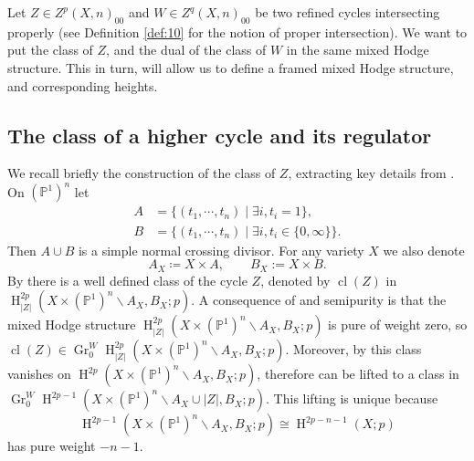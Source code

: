 \documentclass[11pt,a4paper]{amsart}
\renewcommand{\P}{\mathds{P}}
\DeclareMathOperator {\Gr} {Gr}
\DeclareMathOperator {\cl}{cl}
\DeclareMathOperator{\rH}{H}
\numberwithin{equation}{section}
\theoremstyle{plain}
\theoremstyle{definition}
\begin{document}
Let $Z\in
Z^{p}(X,n)_{00}$ and $W\in Z^{q}(X,n)_{00}$ be two refined cycles
intersecting properly (see Definition \ref{def:10} for the notion of proper intersection). We want to put 
the class of $Z$, and the dual of the class of $W$ in the same mixed
Hodge structure. This in turn, will allow us to define a framed mixed
Hodge structure, and corresponding heights.

\subsection{The class of a higher cycle and its regulator}
\label{sec:class-higher-cycle}
We recall briefly
the construction of the class of $Z$, extracting key details from
\cite[Sections 3.2, 3.3]{BGGP:Height}.
On $(\P^{1})^{n}$ let
 \begin{align*}
    A &= \{(t_1,\cdots , t_n)\mid \exists i, t_i=1\},\\
    B & =\{(t_1,\cdots , t_n)\mid \exists i, t_i\in \{0, \infty\}\}.
  \end{align*}
  Then $A\cup B$ is a simple normal crossing divisor. For any variety $X$ we also denote
\begin{displaymath}
  A_X\coloneqq X\times A,\qquad B_X:= X\times B.
\end{displaymath}
By \cite[Proposition 3.3]{BGGP:Height} there is a well defined class of the cycle
$Z$, denoted by $\cl(Z)$ in  $\rH^{2p}_{|Z|}(X\times
(\P^1)^n\smallsetminus A_{X}, B_{X}; p)$. A consequence of \cite[Lemma
3.4]{BGGP:Height} and semipurity is that the mixed Hodge structure $\rH^{2p}_{|Z|}(X\times
(\P^1)^n\smallsetminus A_{X}, B_{X}; p)$ is pure of weight zero, so
$\cl(Z)\in \Gr^{W}_{0}\rH^{2p}_{|Z|}(X\times
(\P^1)^n\smallsetminus A_{X}, B_{X}; p)$.
Moreover, by \cite[Lemma
3.5]{BGGP:Height} this class 
vanishes on $\rH^{2p}(X\times (\P^1)^{n}\smallsetminus A_{X},B_{X};
p)$, therefore can be lifted 
to a class in $\Gr_{0}^{W}\rH^{2p-1}(X\times (\P^1)^n\smallsetminus
A_{X}\cup |Z|,B_{X}; p)$.
This lifting is unique because
\begin{displaymath}
  \rH^{2p-1}(X\times (\P^1)^{n}\smallsetminus A_{X},B_{X}; p) \cong \rH^{2p-n-1}(X; p)
\end{displaymath}
has pure weight $-n-1$. 
\end{document}
